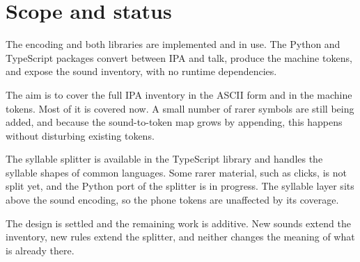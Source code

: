 \section{Scope and status}

The encoding and both libraries are implemented and in use. The Python and TypeScript packages convert between IPA and talk, produce the machine tokens, and expose the sound inventory, with no runtime dependencies.

The aim is to cover the full IPA inventory in the ASCII form and in the machine tokens. Most of it is covered now. A small number of rarer symbols are still being added, and because the sound-to-token map grows by appending, this happens without disturbing existing tokens.

The syllable splitter is available in the TypeScript library and handles the syllable shapes of common languages. Some rarer material, such as clicks, is not split yet, and the Python port of the splitter is in progress. The syllable layer sits above the sound encoding, so the phone tokens are unaffected by its coverage.

The design is settled and the remaining work is additive. New sounds extend the inventory, new rules extend the splitter, and neither changes the meaning of what is already there.
